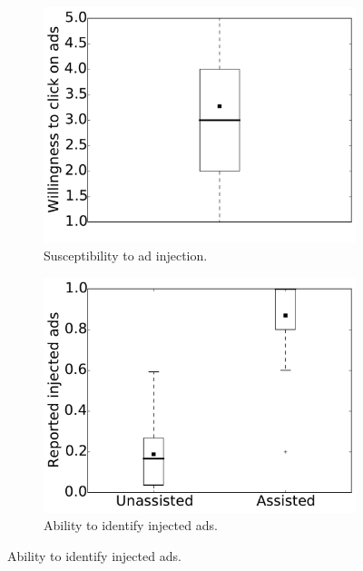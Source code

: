 \begin{figure}[t]
    \centering
    \begin{subfigure}[t]{0.32\textwidth}
        \includegraphics[width=\textwidth]{adinjection/figures/user_study/clicking.pdf}
        \caption{\scriptsize{Susceptibility to ad injection.}}
        \label{adinjection:fig:eval:user_study:susceptibility}
    \end{subfigure}
    \hfill
    \begin{subfigure}[t]{0.32\textwidth}
        \includegraphics[width=\textwidth]{adinjection/figures/user_study/identification.pdf}
        \caption{\scriptsize{Ability to identify injected ads.}}
        \label{adinjection:fig:eval:user_study:identification}

\end{subfigure}
\end{figure}
